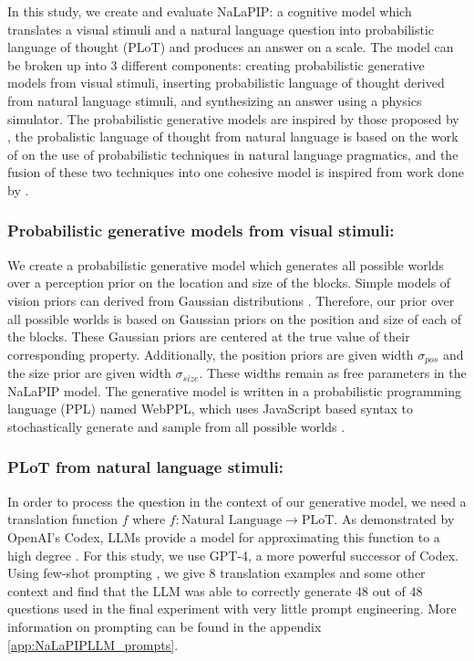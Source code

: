 \documentclass[10pt,letterpaper]{article}
\begin{document}
In this study, we create and evaluate NaLaPIP: a cognitive model which translates a visual stimuli and a natural language question into probabilistic language of thought (PLoT) \cite{goodman2014concepts} and produces an answer on a  scale. The model can be broken up into 3 different components: creating probabilistic generative models from visual stimuli, inserting probabilistic language of thought derived from natural language stimuli, and synthesizing an answer using a physics simulator. The probabilistic generative models are inspired by those proposed by , the probalistic language of thought from natural language is based on the work of  on the use of probabilistic techniques in natural language pragmatics, and the fusion of these two techniques into one cohesive model is inspired from work done by . 

\subsubsection{Probabilistic generative models from visual stimuli:} We create a probabilistic generative model which generates all possible worlds over a perception prior on the location and size of the blocks. Simple models of vision priors can derived from Gaussian distributions \cite{mamassian2002bayesian,series2013learning}. Therefore, our prior over all possible worlds is based on Gaussian priors on the position and size of each of the blocks. These Gaussian priors are centered at the true value of their corresponding property. Additionally, the position priors are given width $\sigma_{pos}$ and the size prior are given width $\sigma_{size}$. These widths remain as free parameters in the NaLaPIP model. 
The generative model is written in a probabilistic programming language (PPL) named WebPPL, which uses JavaScript based syntax to stochastically generate and sample from all possible worlds \cite{dippl}. 

\subsubsection{PLoT from natural language stimuli:} In order to process the question in the context of our generative model, we need a translation function $f$ where $f: \text{Natural Language} \to \text{PLoT}$. As demonstrated by OpenAI's Codex, LLMs provide a model for approximating this function to a high degree \cite{2107.03374}. For this study, we use GPT-4, a more powerful successor of Codex. Using few-shot prompting \cite{brown2020language}, we give 8 translation examples and some other context and find that the LLM was able to correctly generate 48 out of 48 questions used in the final experiment with very little prompt engineering. More information on prompting can be found in the appendix \autoref{app:NaLaPIPLLM_prompts}. 
\end{document}
